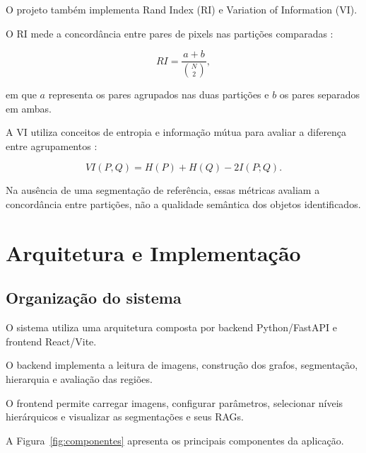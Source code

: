 \documentclass[12pt]{article}
\begin{document}
O projeto também implementa Rand Index (RI)
e Variation of Information (VI).

O RI mede a concordância entre pares de pixels
nas partições comparadas \cite{rand1971}:

\begin{equation}
RI=\frac{a+b}{\binom{N}{2}},
\end{equation}

em que $a$ representa os pares agrupados nas
duas partições e $b$ os pares separados em ambas.

A VI utiliza conceitos de entropia e informação
mútua para avaliar a diferença entre
agrupamentos \cite{meila2007}:

\begin{equation}
VI(P,Q)=H(P)+H(Q)-2I(P;Q).
\end{equation}

Na ausência de uma segmentação de referência,
essas métricas avaliam a concordância entre
partições, não a qualidade semântica dos objetos
identificados.

\section{Arquitetura e Implementação}
\label{sec:arquitetura}

\subsection{Organização do sistema}

O sistema utiliza uma arquitetura composta por
backend Python/FastAPI e frontend React/Vite.

O backend implementa a leitura de imagens,
construção dos grafos, segmentação, hierarquia
e avaliação das regiões.

O frontend permite carregar imagens, configurar
parâmetros, selecionar níveis hierárquicos
e visualizar as segmentações e seus RAGs.

A Figura~\ref{fig:componentes} apresenta
os principais componentes da aplicação.
\end{document}
